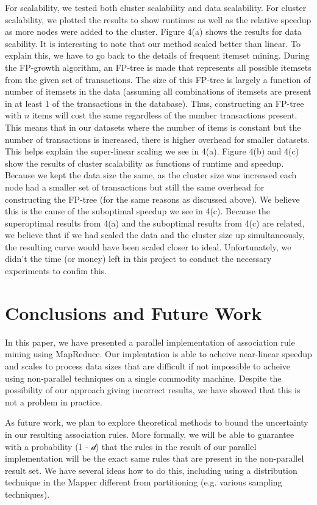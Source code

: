 \documentclass[11pt]{article}
\begin{document}
For scalability, we tested both cluster scalability and data
scalability. For cluster scalability, we plotted the results to show
runtimes as well as the relative speedup as more nodes were added to
the cluster. Figure 4(a) shows the results for data scability. It is
interesting to note that our method scaled better than linear. To
explain this, we have to go back to the details of frequent itemset
mining. During the FP-growth algorithm, an FP-tree is made that
represents all possible itemsets from the given set of
transactions. The size of this FP-tree is largely a function of number
of itemsets in the data (assuming all combinations of itemsets are
present in at least 1 of the transactions in the database). Thus,
constructing an FP-tree with $n$ items will cost the same regardless
of the number transactions present. This means that in our datasets where
the number of items is constant but the number of transactions is
increased, there is higher overhead for smaller datasets. This helps
explain the super-linear scaling we see in 4(a). Figure 4(b) and 4(c)
show the results of cluster scalability as functions of runtime and
speedup. Because we kept the data size the same, as the cluster size
was increased each node had a smaller set of transactions but still
the same overhead for constructing the FP-tree (for the same reasons
as discussed above). We believe this is the cause of the suboptimal
speedup we see in 4(c). Because the superoptimal results from 4(a)
and the suboptimal results from 4(c) are related, we believe that if
we had scaled the data and the cluster size up simultaneously, the
resulting curve would have been scaled closer to ideal. Unfortunately,
we didn't the time (or money) left in this project to conduct the
necessary experiments to confim this. 

\section{Conclusions and Future Work}

In this paper, we have presented a parallel implementation of association rule mining
using MapReduce. Our implentation is able to acheive near-linear
speedup and scales to process data sizes that are difficult if not
impossible to acheive using non-parallel techniques on a single
commodity machine. Despite the possibility of our approach giving
incorrect results, we have showed that this is not a problem in
practice. 

As future work, we plan to explore theoretical methods to bound the
uncertainty in our resulting association rules. More formally, we will
be able to guarantee with a probability (1 - $\mathcal{d}$) that the
rules in the result of our parallel implementation will be the exact
same rules that are present in the non-parallel result set. We have
several ideas how to do this, including using a distribution technique
in the Mapper different from partitioning (e.g. various sampling
techniques). 
\end{document}
